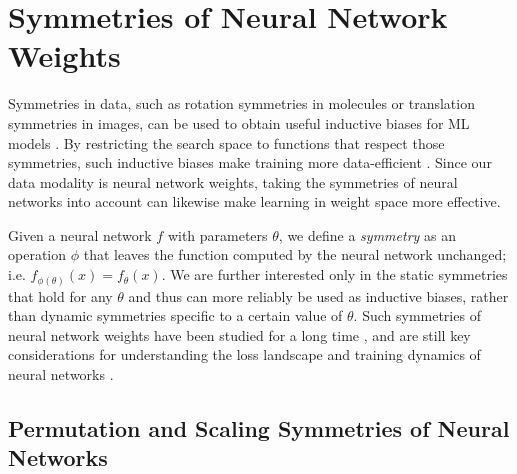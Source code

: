 
\chapter{Symmetries of Neural Network Weights}\label{section:geometry_of_nns}

Symmetries in data, such as rotation symmetries in molecules or translation symmetries in images, can be used to obtain useful inductive biases for ML models \citep{bronsteinGeometricDeepLearning2021,weilerEquivariantCoordinateIndependent2023}. By restricting the search space to functions that respect those symmetries, such inductive biases make training more data-efficient \citep{brehmerDoesEquivarianceMatter2024}. Since our data modality is neural network weights, taking the symmetries of neural networks into account can likewise make learning in weight space more effective. 

Given a neural network $f$ with parameters $\theta$, we define a \textit{symmetry} as an operation $\phi$ that leaves the function computed by the neural network unchanged; i.e. $f_{\phi(\theta)}(x) = f_\theta(x)$. We are further interested only in the static symmetries that hold for any $\theta$ and thus can more reliably be used as inductive biases, rather than dynamic symmetries specific to a certain value of $\theta$. Such symmetries of neural network weights have been studied for a long time \citep{hecht-nielsenALGEBRAICSTRUCTUREFEEDFORWARD1990}, and are still key considerations for understanding the loss landscape and training dynamics of neural networks \citep{breaWeightspaceSymmetryDeep2019a,simsekGeometryLossLandscape2021,limEmpiricalImpactNeural2024,zhaoIMPROVINGCONVERGENCEGENERALIZATION2024}.

\section{Permutation and Scaling Symmetries of Neural Networks} \label{sec:perm_and_scale_sym}

